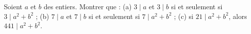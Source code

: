 Soient $a$ et $b$ des entiers. Montrer que : (a) $3 \mid a$ et $3 \mid b$ si et seulement si $3 \mid a^2 + b^2$ ; (b) $7 \mid a$ et $7 \mid b$ si et seulement si $7 \mid a^2 + b^2$ ; (c) si $21 \mid a^2 + b^2$, alors $441 \mid a^2 + b^2$.
